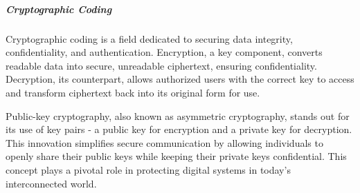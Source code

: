 \subparagraph{Cryptographic Coding}
Cryptographic coding is a field dedicated to securing data integrity, confidentiality, and authentication. Encryption, a key component, converts readable data into secure, unreadable ciphertext, ensuring confidentiality. Decryption, its counterpart, allows authorized users with the correct key to access and transform ciphertext back into its original form for use.

Public-key cryptography, also known as asymmetric cryptography, stands out for its use of key pairs - a public key for encryption and a private key for decryption. This innovation simplifies secure communication by allowing individuals to openly share their public keys while keeping their private keys confidential. This concept plays a pivotal role in protecting digital systems in today's interconnected world.

